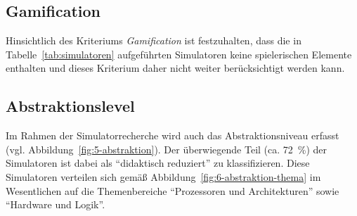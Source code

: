 \subsection{Gamification}

Hinsichtlich des Kriteriums \textit{Gamification} ist festzuhalten, dass die in Tabelle~\ref{tab:simulatoren} aufgeführten Simulatoren keine spielerischen Elemente enthalten und dieses Kriterium daher nicht weiter berücksichtigt werden kann.

\subsection{Abstraktionslevel}

Im Rahmen der Simulatorrecherche wird auch das Abstraktionsniveau erfasst (vgl. Abbildung~\ref{fig:5-abstraktion}). Der überwiegende Teil (ca. 72~\%) der Simulatoren ist dabei als \enquote{didaktisch reduziert} zu klassifizieren. Diese Simulatoren verteilen sich gemäß Abbildung~\ref{fig:6-abstraktion-thema} im Wesentlichen auf die Themenbereiche \enquote{Prozessoren und Architekturen} sowie \enquote{Hardware und Logik}.


